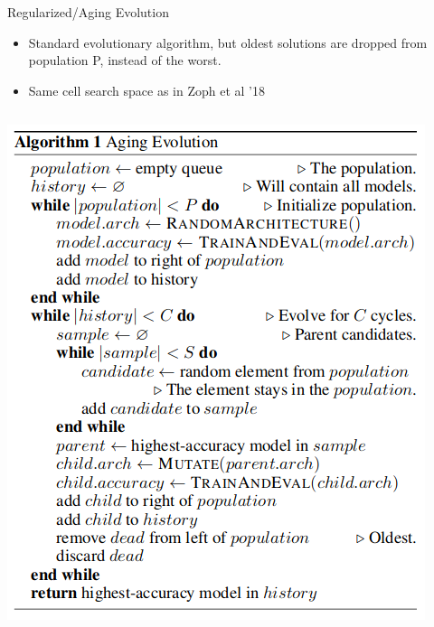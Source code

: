 \begin{frame}[c]{Regularized/Aging Evolution }

\centering
\begin{itemize}
	\item Standard evolutionary algorithm, but oldest solutions are dropped from
	population P, instead of the worst.
	\item Same cell search space as in Zoph et al ’18\\
\end{itemize}

\begin{columns}[T]

\includegraphics[width=\textwidth]{images_lec7/aging_evolution_alg.png}


\end{columns}
\end{frame}
